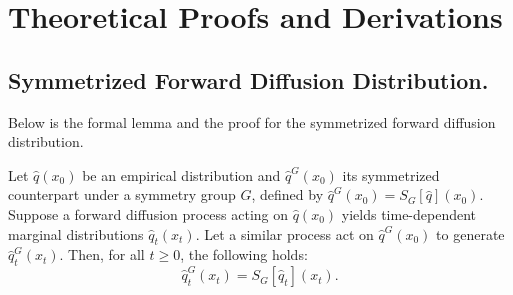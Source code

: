 

\section{Theoretical Proofs and Derivations}

\subsection{Symmetrized Forward Diffusion Distribution.}
\label{sub_app:symmetrized}

Below is the formal lemma and the proof for the symmetrized forward diffusion distribution. 
\begin{tcolorbox}[title=Symmetrized Forward Diffusion Distributions]
\begin{lemma}
Let \(\hat{q}(x_0)\) be an empirical distribution and \(\hat{q}^G(x_0)\) its symmetrized counterpart under a symmetry group \(G\), defined by \(\hat{q}^G(x_0) = S_G[\hat{q}](x_0)\). Suppose a forward diffusion process acting on \(\hat{q}(x_0)\) yields time-dependent marginal distributions \(\hat{q}_t(x_t)\). Let a similar process act on \(\hat{q}^G(x_0)\) to generate \(\hat{q}_t^G(x_t)\). Then, for all \(t \geq 0\), the following holds:
\[
\hat{q}_t^G(x_t) = S_G[\hat{q}_t](x_t).
\]
\end{lemma}
\end{tcolorbox}

